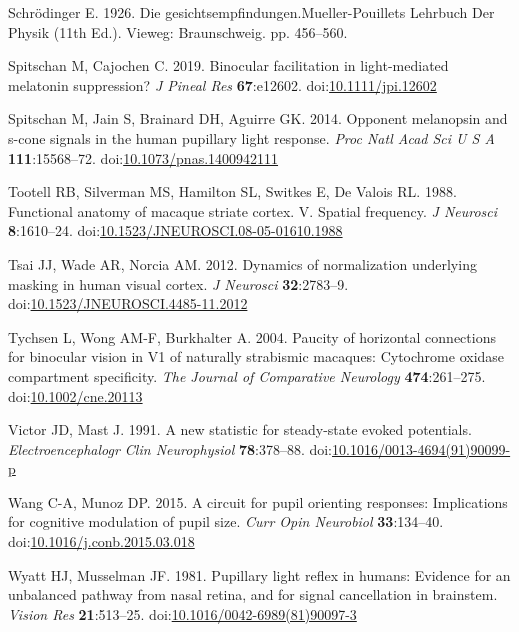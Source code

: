 \documentclass[
]{article}
\newlength{\cslhangindent}
\newlength{\cslentryspacingunit} %
\newenvironment{CSLReferences}[2] %
 {%
  \setlength{\parindent}{0pt}
  \ifodd #1
  \let\oldpar\par
  \def\par{\hangindent=\cslhangindent\oldpar}
  \fi
  \setlength{\parskip}{#2\cslentryspacingunit}
 }%
 {}
\begin{document}
\begin{CSLReferences}{1}{0}
\leavevmode{}%
Schrödinger E. 1926. Die gesichtsempfindungen.Mueller-Pouillets Lehrbuch Der Physik (11th Ed.). Vieweg: Braunschweig. pp. 456--560.

\leavevmode{}%
Spitschan M, Cajochen C. 2019. Binocular facilitation in light-mediated melatonin suppression? \emph{J Pineal Res} \textbf{67}:e12602. doi:\href{https://doi.org/10.1111/jpi.12602}{10.1111/jpi.12602}

\leavevmode{}%
Spitschan M, Jain S, Brainard DH, Aguirre GK. 2014. Opponent melanopsin and s-cone signals in the human pupillary light response. \emph{Proc Natl Acad Sci U S A} \textbf{111}:15568--72. doi:\href{https://doi.org/10.1073/pnas.1400942111}{10.1073/pnas.1400942111}

\leavevmode{}%
Tootell RB, Silverman MS, Hamilton SL, Switkes E, De Valois RL. 1988. Functional anatomy of macaque striate cortex. V. Spatial frequency. \emph{J Neurosci} \textbf{8}:1610--24. doi:\href{https://doi.org/10.1523/JNEUROSCI.08-05-01610.1988}{10.1523/JNEUROSCI.08-05-01610.1988}

\leavevmode{}%
Tsai JJ, Wade AR, Norcia AM. 2012. Dynamics of normalization underlying masking in human visual cortex. \emph{J Neurosci} \textbf{32}:2783--9. doi:\href{https://doi.org/10.1523/JNEUROSCI.4485-11.2012}{10.1523/JNEUROSCI.4485-11.2012}

\leavevmode{}%
Tychsen L, Wong AM-F, Burkhalter A. 2004. Paucity of horizontal connections for binocular vision in V1 of naturally strabismic macaques: Cytochrome oxidase compartment specificity. \emph{The Journal of Comparative Neurology} \textbf{474}:261--275. doi:\href{https://doi.org/10.1002/cne.20113}{10.1002/cne.20113}

\leavevmode{}%
Victor JD, Mast J. 1991. A new statistic for steady-state evoked potentials. \emph{Electroencephalogr Clin Neurophysiol} \textbf{78}:378--88. doi:\href{https://doi.org/10.1016/0013-4694(91)90099-p}{10.1016/0013-4694(91)90099-p}

\leavevmode{}%
Wang C-A, Munoz DP. 2015. A circuit for pupil orienting responses: Implications for cognitive modulation of pupil size. \emph{Curr Opin Neurobiol} \textbf{33}:134--40. doi:\href{https://doi.org/10.1016/j.conb.2015.03.018}{10.1016/j.conb.2015.03.018}

\leavevmode{}%
Wyatt HJ, Musselman JF. 1981. Pupillary light reflex in humans: Evidence for an unbalanced pathway from nasal retina, and for signal cancellation in brainstem. \emph{Vision Res} \textbf{21}:513--25. doi:\href{https://doi.org/10.1016/0042-6989(81)90097-3}{10.1016/0042-6989(81)90097-3}

\end{CSLReferences}
\end{document}
